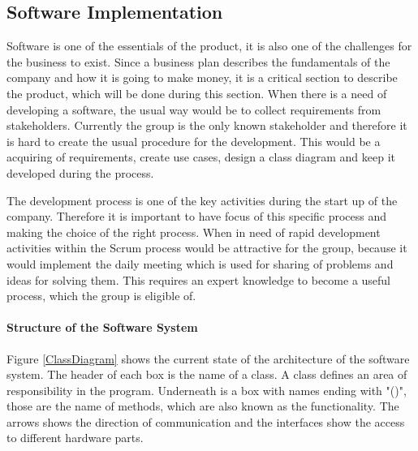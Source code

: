 \subsection{Software Implementation}
Software is one of the essentials of the product, it is also one of the challenges for the business to exist. Since a business plan describes the fundamentals of the company and how it is going to make money, it is a critical section to describe the product, which will be done during this section. When there is a need of developing a software, the usual way would be to collect requirements from stakeholders. Currently the group is the only known stakeholder and therefore it is hard to create the usual procedure for the development. This would be a acquiring of requirements, create use cases, design a class diagram and keep it developed during the process. 

The development process is one of the key activities during the start up of the company. Therefore it is important to have focus of this specific process and making the choice of the right process. When in need of rapid development activities within the Scrum process would be attractive for the group, because it would implement the daily meeting which is used for sharing of problems and ideas for solving them. This requires an expert knowledge to become a useful process, which the group is eligible of.

\paragraph*{Structure of the Software System}
Figure \ref{ClassDiagram} shows the current state of the architecture of the software system. The header of each box is the name of a class. A class defines an area of responsibility in the program. Underneath is a box with names ending with "()", those are the name of methods, which are also known as the functionality. The arrows shows the direction of communication and the interfaces show the access to different hardware parts.

